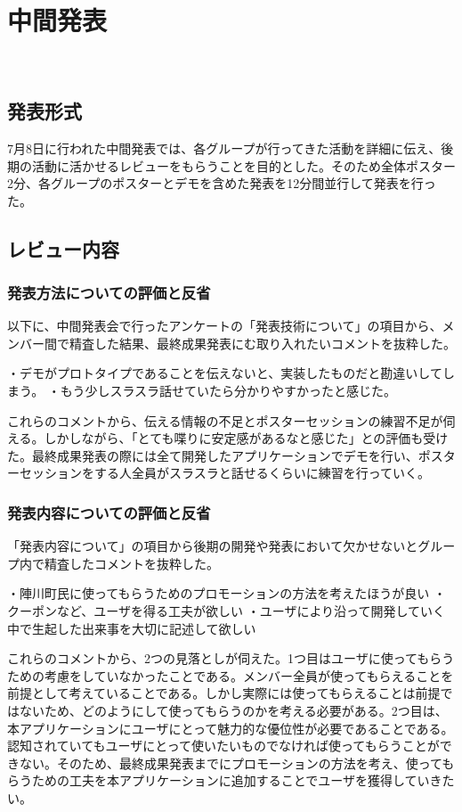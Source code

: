 \chapter{中間発表}
​
\section{発表形式}
7月8日に行われた中間発表では、各グループが行ってきた活動を詳細に伝え、後期の活動に活かせるレビューをもらうことを目的とした。そのため全体ポスター2分、各グループのポスターとデモを含めた発表を12分間並行して発表を行った。
\section{レビュー内容}%
\subsection{発表方法についての評価と反省}%
以下に、中間発表会で行ったアンケートの「発表技術について」の項目から、メンバー間で精査した結果、最終成果発表にむ取り入れたいコメントを抜粋した。

    ・デモがプロトタイプであることを伝えないと、実装したものだと勘違いしてしまう。
    ・もう少しスラスラ話せていたら分かりやすかったと感じた。

    これらのコメントから、伝える情報の不足とポスターセッションの練習不足が伺える。しかしながら、「とても喋りに安定感があるなと感じた」との評価も受けた。最終成果発表の際には全て開発したアプリケーションでデモを行い、ポスターセッションをする人全員がスラスラと話せるくらいに練習を行っていく。

\subsection{発表内容についての評価と反省}
    「発表内容について」の項目から後期の開発や発表において欠かせないとグループ内で精査したコメントを抜粋した。

    ・陣川町民に使ってもらうためのプロモーションの方法を考えたほうが良い
    ・クーポンなど、ユーザを得る工夫が欲しい
    ・ユーザにより沿って開発していく中で生起した出来事を大切に記述して欲しい

    これらのコメントから、2つの見落としが伺えた。1つ目はユーザに使ってもらうための考慮をしていなかったことである。メンバー全員が使ってもらえることを前提として考えていることである。しかし実際には使ってもらえることは前提ではないため、どのようにして使ってもらうのかを考える必要がある。2つ目は、本アプリケーションにユーザにとって魅力的な優位性が必要であることである。認知されていてもユーザにとって使いたいものでなければ使ってもらうことができない。そのため、最終成果発表までにプロモーションの方法を考え、使ってもらうための工夫を本アプリケーションに追加することでユーザを獲得していきたい。
